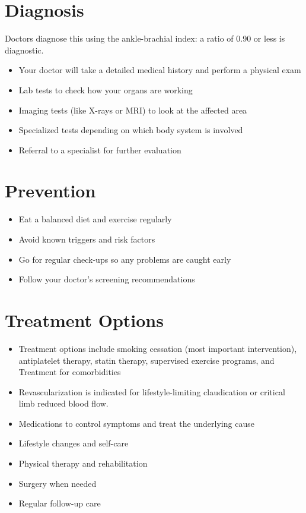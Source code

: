 \section{Diagnosis}
Doctors diagnose this using the ankle-brachial index: a ratio of 0.90 or less is diagnostic.

\begin{itemize}[noitemsep]
  \item Your doctor will take a detailed medical history and perform a physical exam
  \item Lab tests to check how your organs are working
  \item Imaging tests (like X-rays or MRI) to look at the affected area
  \item Specialized tests depending on which body system is involved
  \item Referral to a specialist for further evaluation
\end{itemize}

\section{Prevention}

\begin{itemize}[noitemsep]
  \item Eat a balanced diet and exercise regularly
  \item Avoid known triggers and risk factors
  \item Go for regular check-ups so any problems are caught early
  \item Follow your doctor's screening recommendations
\end{itemize}

\section{Treatment Options}

\begin{itemize}[noitemsep]
  \item Treatment options include smoking cessation (most important intervention), antiplatelet therapy, statin therapy, supervised exercise programs, and Treatment for comorbidities
  \item Revascularization is indicated for lifestyle-limiting claudication or critical limb reduced blood flow.
  \item Medications to control symptoms and treat the underlying cause
  \item Lifestyle changes and self-care
  \item Physical therapy and rehabilitation
  \item Surgery when needed
  \item Regular follow-up care
\end{itemize}

